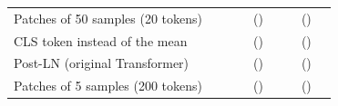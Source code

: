 \begin{tabular}{lrrcccccc}
Patches of 50 samples (20 tokens) & \transformerAttnLayersPatchFiveZero{} & \transformerAttnTokensPatchFiveZero{} & \transformerAttnDistFirstPatchFiveZero{} & \transformerAttnDistLastPatchFiveZero{} (\transformerAttnDistUniformPatchFiveZero{}) & \transformerAttnQentropyFirstPatchFiveZero{} & \transformerAttnQentropyLastPatchFiveZero{} & \transformerAttnDiagLastPatchFiveZero{} (\transformerAttnUniformPatchFiveZero{}) & \transformerAttnRecvEntropyLastPatchFiveZero{} \\
CLS token instead of the mean & \transformerAttnLayersCls{} & \transformerAttnTokensCls{} & \transformerAttnDistFirstCls{} & \transformerAttnDistLastCls{} (\transformerAttnDistUniformCls{}) & \transformerAttnQentropyFirstCls{} & \transformerAttnQentropyLastCls{} & \transformerAttnDiagLastCls{} (\transformerAttnUniformCls{}) & \transformerAttnRecvEntropyLastCls{} \\
Post-LN (original Transformer) & \transformerAttnLayersPostLn{} & \transformerAttnTokensPostLn{} & \transformerAttnDistFirstPostLn{} & \transformerAttnDistLastPostLn{} (\transformerAttnDistUniformPostLn{}) & \transformerAttnQentropyFirstPostLn{} & \transformerAttnQentropyLastPostLn{} & \transformerAttnDiagLastPostLn{} (\transformerAttnUniformPostLn{}) & \transformerAttnRecvEntropyLastPostLn{} \\
Patches of 5 samples (200 tokens) & \transformerAttnLayersPatchFive{} & \transformerAttnTokensPatchFive{} & \transformerAttnDistFirstPatchFive{} & \transformerAttnDistLastPatchFive{} (\transformerAttnDistUniformPatchFive{}) & \transformerAttnQentropyFirstPatchFive{} & \transformerAttnQentropyLastPatchFive{} & \transformerAttnDiagLastPatchFive{} (\transformerAttnUniformPatchFive{}) & \transformerAttnRecvEntropyLastPatchFive{} \\
\bottomrule
\end{tabular}
